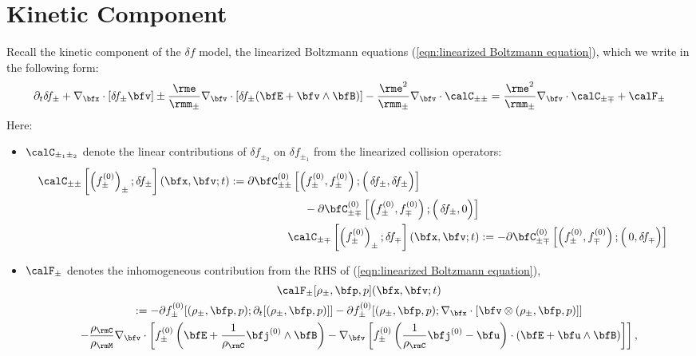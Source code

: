 \chapter{Kinetic Component}\label{cha:kinetic component}
    Recall the kinetic component of the $\delta\!f$ model, the linearized Boltzmann equations (\ref{eqn:linearized Boltzmann equation}), which we write in the following form:
    \begin{equation}\label{eqn:linearized Boltzmann equation simplified}
        \partial_{t}\delta\!f_{\pm} + \nabla_{\bfx}\cdot[\delta\!f_{\pm}\bfv] \pm \frac{\rme}{\rmm_{\pm}}\nabla_{\bfv}\cdot[\delta\!f_{\pm}(\bfE + \bfv\wedge\bfB)] - \frac{\rme^{2}}{\rmm_{\pm}}\nabla_{\bfv}\cdot\calC_{\pm\pm}  =  \frac{\rme^{2}}{\rmm_{\pm}}\nabla_{\bfv}\cdot\calC_{\pm\mp} + \calF_{\pm}
    \end{equation}
    Here:
    \begin{itemize}
        \item  $\calC_{\pm_{1}\pm_{2}}$ denote the linear contributions of $\delta\!f_{\pm_{2}}$ on $\delta\!f_{\pm_{1}}$ from the linearized collision operators:
        \begin{align}
            \begin{split}
                \calC_{\pm\pm}\left[\left(f_{\pm}^{(0)}\right)_{\pm}; \delta\!f_{\pm}\right](\bfx, \bfv; t)  &:=  \partial\bfC_{\pm\pm}^{(0)}\left[\left(f_{\pm}^{(0)}, f_{\pm}^{(0)}\right); \left({\color{white} f_{\pm}^{(0)}}\!\!\!\!\!\!\!\!\!\delta\!f_{\pm}, \delta\!f_{\pm}\right)\right]  \\
                &\;\;\;\;\;\;\;\;\;\;\;\;\;\;\;\;\;\;\;\;\;\;\;\;- \partial\bfC_{\pm\mp}^{(0)}\left[\left(f_{\pm}^{(0)}, f_{\mp}^{(0)}\right); \left({\color{white} f_{\pm}^{(0)}}\!\!\!\!\!\!\!\!\!\delta\!f_{\pm}, 0 \right)\right]
            \end{split}  \label{eqn:linearized collision operator}  \\
            \calC_{\pm\mp}\left[\left(f_{\pm}^{(0)}\right)_{\pm}; \delta\!f_{\mp}\right](\bfx, \bfv; t)  &:=   - \partial\bfC_{\pm\mp}^{(0)}\left[\left(f_{\pm}^{(0)}, f_{\mp}^{(0)}\right); \left({\color{white} f_{\pm}^{(0)}}\!\!\!\!\!\!\!\!\!0, \delta\!f_{\mp} \right)\right]
        \end{align}
        \item  $\calF_{\pm}$ denotes the inhomogeneous contribution from the RHS of (\ref{eqn:linearized Boltzmann equation}),
        \begin{multline}
            \calF_{\pm}[\rho_{\pm}, \bfp, p](\bfx, \bfv; t)  \\
            :=  - \partial f_{\pm}^{(0)}[(\rho_{\pm}, \bfp, p); \partial_{t}[(\rho_{\pm}, \bfp, p)]] - \partial f_{\pm}^{(0)}[(\rho_{\pm}, \bfp, p); \nabla_{\bfx}\cdot[\bfv\otimes(\rho_{\pm}, \bfp, p)]]  \\
            - \frac{\rho_{\rmC}}{\rho_{\rmM}}\nabla_{\bfv}\cdot\left[f_{\pm}^{(0)}\left(\bfE + \frac{1}{\rho_{\rmC}}\bfj^{(0)}\wedge\bfB\right) - \nabla_{\bfv}\left[f_{\pm}^{(0)}\left(\frac{1}{\rho_{\rmC}}\bfj^{(0)} - \bfu\right)\cdot\left(\bfE + \bfu\wedge\bfB\right)\right]\right],
        \end{multline}
    \end{itemize}
